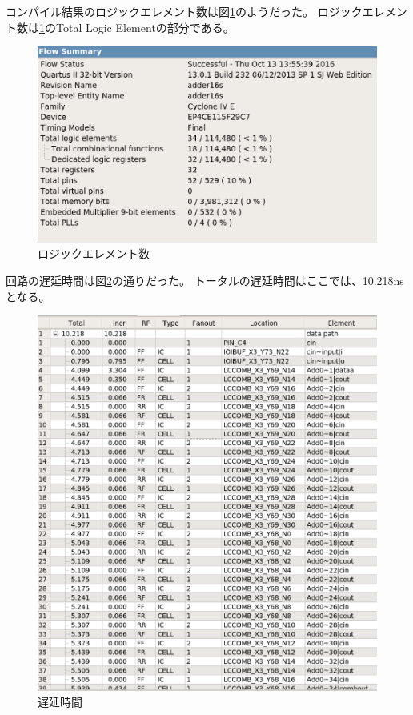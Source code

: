 \documentclass[uplatex]{jsarticle}
\begin{document}
コンパイル結果のロジックエレメント数は図\ref{fig:12}のようだった。
ロジックエレメント数は\ref{fig:12}のTotal Logic Elementの部分である。  

\begin{figure}[htb]
  \begin{center}
    \includegraphics[width=13cm]{images/fig12.eps}
    \caption{ロジックエレメント数}
    \label{fig:12}
  \end{center}
\end{figure}

回路の遅延時間は図\ref{fig:13}の通りだった。
トータルの遅延時間はここでは、10.218nsとなる。

\begin{figure}[htb]
  \begin{center}
    \includegraphics[width=13cm]{images/fig13.eps}
    \caption{遅延時間}
    \label{fig:13}
  \end{center}
\end{figure}
\end{document}
